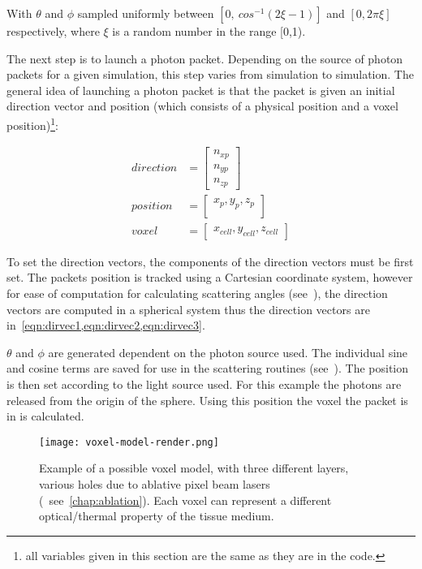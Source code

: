 With $\theta$ and $\phi$ sampled uniformly between $[0,\ cos^{-1}(2\xi-1)]$ and $[0,2\pi\xi]$ respectively, where $\xi$ is a random number in the range [0,1).

The next step is to launch a photon packet. 
Depending on the source of photon packets for a given simulation, this step varies from simulation to simulation. 
The general idea of launching a photon packet is that the packet is given an initial direction vector and position (which consists of a physical position and a voxel position)\footnote{all variables given in this section are the same as they are in the code.}:

\begin{align}
	direction &= \begin{bmatrix}
		n_{xp}\\
		n_{yp}\\
		n_{zp}
	\end{bmatrix}\\
	position &= \begin{bmatrix}
		x_p, y_p, z_p\\
	\end{bmatrix}\\
	voxel &= \begin{bmatrix}
		x_{cell}, y_{cell}, z_{cell}
	\end{bmatrix}	 
\end{align}

To set the direction vectors, the components of the direction vectors must be first set. The packets position is tracked using a Cartesian coordinate system, however for ease of computation for calculating scattering angles (see~), the direction vectors are computed in a spherical system thus the direction vectors are in~\cref{eqn:dirvec1,eqn:dirvec2,eqn:dirvec3}. 

$\theta$ and $\phi$ are generated dependent on the photon source used. The individual sine and cosine terms are saved for use in the scattering routines (see~).
The position is then set according to the light source used.
For this example the photons are released from the origin of the sphere.
Using this position the voxel the packet is in is calculated.
\FloatBarrier

\begin{figure}[!ht]
\centering
\texttt{[image: voxel-model-render.png]}
\caption{Example of a possible voxel model, with three different layers, various holes due to ablative pixel beam lasers (~see~\cref{chap:ablation}). Each voxel can represent a different optical/thermal property of the tissue medium.}
\label{fig:voxel-model}
\vspace{-20pt}
\end{figure}
